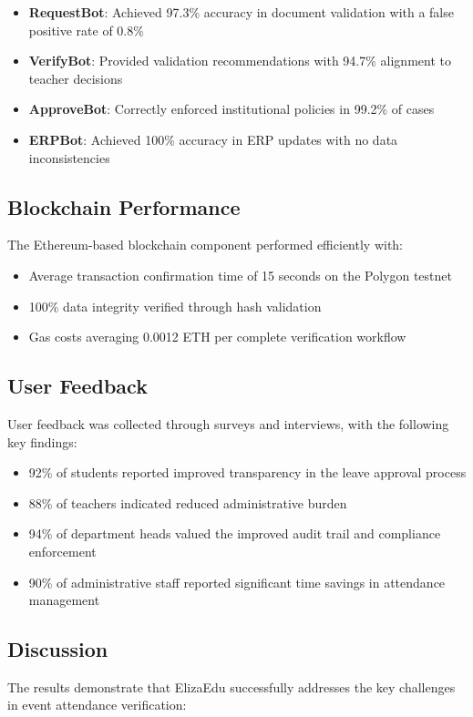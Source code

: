\documentclass[a4paper,12pt]{article}
\begin{document}
\begin{itemize}
    \item \textbf{RequestBot}: Achieved 97.3\% accuracy in document validation with a false positive rate of 0.8\%
    \item \textbf{VerifyBot}: Provided validation recommendations with 94.7\% alignment to teacher decisions
    \item \textbf{ApproveBot}: Correctly enforced institutional policies in 99.2\% of cases
    \item \textbf{ERPBot}: Achieved 100\% accuracy in ERP updates with no data inconsistencies
\end{itemize}

\subsection{Blockchain Performance}
The Ethereum-based blockchain component performed efficiently with:

\begin{itemize}
    \item Average transaction confirmation time of 15 seconds on the Polygon testnet
    \item 100\% data integrity verified through hash validation
    \item Gas costs averaging 0.0012 ETH per complete verification workflow
\end{itemize}

\subsection{User Feedback}
User feedback was collected through surveys and interviews, with the following key findings:

\begin{itemize}
    \item 92\% of students reported improved transparency in the leave approval process
    \item 88\% of teachers indicated reduced administrative burden
    \item 94\% of department heads valued the improved audit trail and compliance enforcement
    \item 90\% of administrative staff reported significant time savings in attendance management
\end{itemize}

\subsection{Discussion}
The results demonstrate that ElizaEdu successfully addresses the key challenges in event attendance verification:
\end{document}
